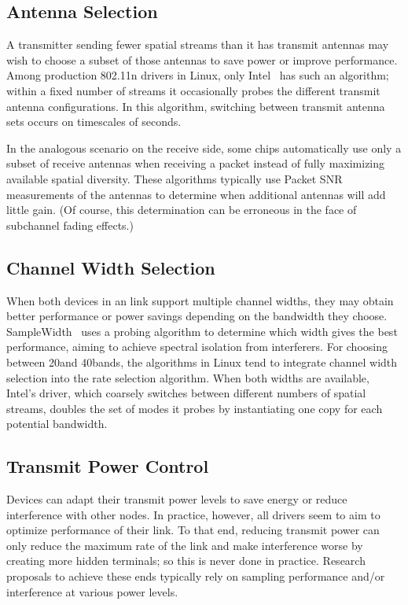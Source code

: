 \subsection{Antenna Selection}
A transmitter sending fewer spatial streams than it has transmit antennas may wish to choose a subset of those antennas to save power or improve performance. Among production 802.11n drivers in Linux, only Intel~\cite{iwlwifi} has such an algorithm; within a fixed number of streams it occasionally probes the different transmit antenna configurations. In this algorithm, switching between transmit antenna sets occurs on timescales of seconds.

In the analogous scenario on the receive side, some chips automatically use only a subset of receive antennas when receiving a packet instead of fully maximizing available spatial diversity. These algorithms typically use Packet SNR measurements of the antennas to determine when additional antennas will add little gain. (Of course, this determination can be erroneous in the face of subchannel fading effects.)

\subsection{Channel Width Selection}
When both devices in an link support multiple channel widths, they may obtain better performance or power savings depending on the bandwidth they choose. SampleWidth~\cite{Chandra_SampleWidth} uses a probing algorithm to determine which width gives the best performance, aiming to achieve spectral isolation from interferers. For choosing between 20\MHz and 40\MHz bands, the algorithms in Linux tend to integrate channel width selection into the rate selection algorithm. When both widths are available, Intel's driver, which coarsely switches between different numbers of spatial streams, doubles the set of modes it probes by instantiating one copy for each potential bandwidth.

\subsection{Transmit Power Control}
Devices can adapt their transmit power levels to save energy or reduce interference with other nodes. In practice, however, all drivers seem to aim to optimize performance of their link. To that end, reducing transmit power can only reduce the maximum rate of the link and make interference worse by creating more hidden terminals; so this is never done in practice. Research proposals to achieve these ends typically rely on sampling performance and/or interference at various power levels.

